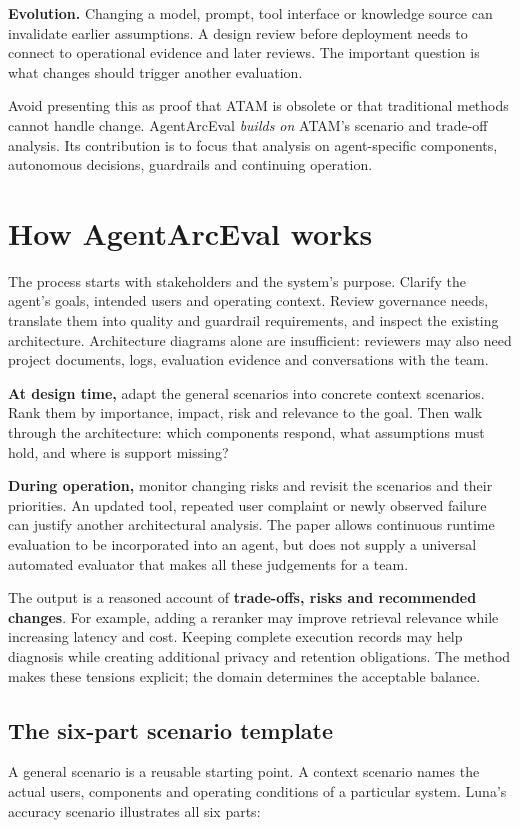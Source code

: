 \documentclass[11pt,a4paper]{article}
\begin{document}
\textbf{Evolution.} Changing a model, prompt, tool interface or knowledge source can invalidate earlier assumptions. A design review before deployment needs to connect to operational evidence and later reviews. The important question is what changes should trigger another evaluation.

Avoid presenting this as proof that ATAM is obsolete or that traditional methods cannot handle change. AgentArcEval \emph{builds on} ATAM's scenario and trade-off analysis. Its contribution is to focus that analysis on agent-specific components, autonomous decisions, guardrails and continuing operation.

\section{How AgentArcEval works}
The process starts with stakeholders and the system's purpose. Clarify the agent's goals, intended users and operating context. Review governance needs, translate them into quality and guardrail requirements, and inspect the existing architecture. Architecture diagrams alone are insufficient: reviewers may also need project documents, logs, evaluation evidence and conversations with the team.

\textbf{At design time,} adapt the general scenarios into concrete context scenarios. Rank them by importance, impact, risk and relevance to the goal. Then walk through the architecture: which components respond, what assumptions must hold, and where is support missing?

\textbf{During operation,} monitor changing risks and revisit the scenarios and their priorities. An updated tool, repeated user complaint or newly observed failure can justify another architectural analysis. The paper allows continuous runtime evaluation to be incorporated into an agent, but does not supply a universal automated evaluator that makes all these judgements for a team.

The output is a reasoned account of \textbf{trade-offs, risks and recommended changes}. For example, adding a reranker may improve retrieval relevance while increasing latency and cost. Keeping complete execution records may help diagnosis while creating additional privacy and retention obligations. The method makes these tensions explicit; the domain determines the acceptable balance.

\subsection{The six-part scenario template}
A general scenario is a reusable starting point. A context scenario names the actual users, components and operating conditions of a particular system. Luna's accuracy scenario illustrates all six parts:
\end{document}
